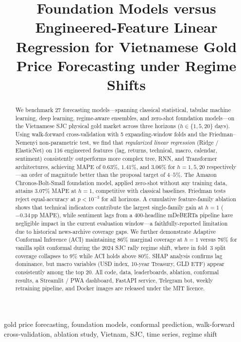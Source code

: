 \documentclass[conference]{IEEEtran}
\title{Foundation Models versus Engineered-Feature Linear Regression for Vietnamese Gold Price Forecasting under Regime Shifts}
\author{
\IEEEauthorblockN{WangNhat\IEEEauthorrefmark{1}}
\IEEEauthorblockA{
\IEEEauthorrefmark{1}Faculty of Information Technology, Ton Duc Thang University, Vietnam \\
Email: dev2@wolffungame.com
}
}
\begin{document}
\maketitle

\begin{abstract}
We benchmark 27 forecasting models---spanning classical statistical, tabular machine learning, deep learning, regime-aware ensembles, and zero-shot foundation models---on the Vietnamese SJC physical gold market across three horizons ($h\in\{1,5,20\}$ days). Using walk-forward cross-validation with 5 expanding-window folds and the Friedman--Nemenyi non-parametric test, we find that \emph{regularized linear regression} (Ridge / ElasticNet) on 116 engineered features (lag, returns, technical, macro, calendar, sentiment) consistently outperforms more complex tree, RNN, and Transformer architectures, achieving MAPE of $0.63\%$, $1.41\%$, and $3.06\%$ for $h=1,5,20$ respectively---an order of magnitude better than the proposal target of $4$--$5\%$. The Amazon Chronos-Bolt-Small foundation model, applied zero-shot without any training data, attains $3.07\%$ MAPE at $h=1$, competitive with classical baselines. Friedman tests reject equal-accuracy at $p<10^{-3}$ for all horizons. A cumulative feature-family ablation shows that technical indicators contribute the largest single-family gain at $h=1$ ($-0.34$\,pp MAPE), while sentiment lags from a $400$-headline mDeBERTa pipeline have negligible impact in the current evaluation window---a faithfully-reported limitation due to historical news-archive coverage gaps. We further demonstrate Adaptive Conformal Inference (ACI) maintaining $86\%$ marginal coverage at $h=1$ versus $76\%$ for vanilla split conformal during the 2024 SJC rally regime shift, where in fold~3 split coverage collapses to $9\%$ while ACI holds above $80\%$. SHAP analysis confirms lag dominance, but macro variables (USD index, 10-year Treasury, GLD ETF) appear consistently among the top 20. All code, data, leaderboards, ablation, conformal results, a Streamlit / PWA dashboard, FastAPI service, Telegram bot, weekly retraining pipeline, and Docker images are released under the MIT licence.
\end{abstract}

\begin{IEEEkeywords}
gold price forecasting, foundation models, conformal prediction, walk-forward cross-validation, ablation study, Vietnam, SJC, time series, regime shift
\end{IEEEkeywords}
\end{document}
